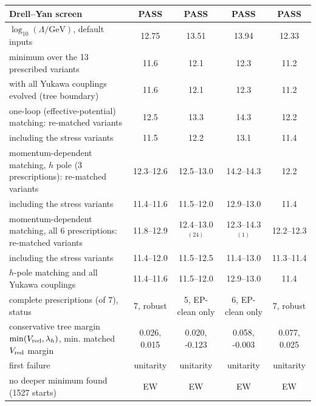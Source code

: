\documentclass[twocolumn,epjc3]{svjour3}
\begin{document}
\begin{table}[t]
\begin{tabular}{p{5.0cm}cccc}
Drell--Yan screen & PASS & PASS & PASS & PASS\\
\midrule
$\log_{10}(\Lambda/\mathrm{GeV})$, default inputs & 12.75 & 13.51 & 13.94 & 12.33\\
minimum over the 13 prescribed variants & 11.6 & 12.1 & 12.3 & 11.2\\
\quad with all Yukawa couplings evolved (tree boundary) & 11.6 & 12.1 & 12.3 & 11.2\\
\quad one-loop (effective-potential) matching: re-matched variants & 12.5 & 13.3 & 14.3 & 12.2\\
\quad \qquad including the stress variants & 11.5 & 12.2 & 13.1 & 11.4\\
\quad momentum-dependent matching, $h$ pole (3 prescriptions): re-matched variants & 12.3--12.6 & 12.5--13.0 & 14.2--14.3 & 12.2\\
\quad \qquad including the stress variants & 11.4--11.6 & 11.5--12.0 & 12.9--13.0 & 11.4\\
\quad momentum-dependent matching, all 6 prescriptions: re-matched variants & 11.8--12.9 & 12.4--13.0$^{(24)}$ & 12.3--14.3$^{(1)}$ & 12.2--12.3\\
\quad \qquad including the stress variants & 11.4--12.0 & 11.5--12.5 & 11.4--13.0 & 11.3--11.4\\
\quad $h$-pole matching and all Yukawa couplings & 11.4--11.6 & 11.5--12.0 & 12.9--13.0 & 11.4\\
complete prescriptions (of 7), status & 7, robust & 5, EP-clean only & 6, EP-clean only & 7, robust\\
conservative tree margin $\min(V_{\rm red},\lambda_h)$, min. matched $V_{\rm red}$ margin & 0.026, 0.015 & 0.020, -0.123 & 0.058, -0.003 & 0.077, 0.025\\
first failure & unitarity & unitarity & unitarity & unitarity\\
no deeper minimum found (1527 starts) & EW & EW & EW & EW\\
\bottomrule\end{tabular}

\end{table}
\end{document}
